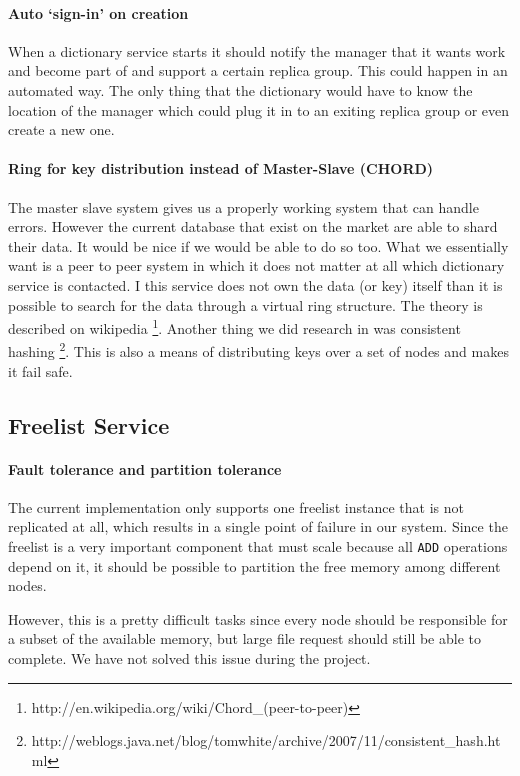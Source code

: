 \documentclass[12pt,a4paper]{scrartcl}
\begin{document}
\paragraph{Auto `sign-in' on creation}
When a dictionary service starts it should notify the manager that it wants work and become part of and support a certain replica group. This could happen in an automated way. The only thing that the dictionary would have to know the location of the manager which could plug it in to an exiting replica group or even create a new one.

\paragraph{Ring for key distribution instead of Master-Slave (CHORD)}
The master slave system gives us a properly working system that can handle errors. However the current database that exist on the market are able to shard their data. It would be nice if we would be able to do so too. What we essentially want is a peer to peer system in which it does not matter at all which dictionary service is contacted. I this service does not own the data (or key) itself than it is possible to search for the data through a virtual ring structure. The theory is described on wikipedia \footnote{http://en.wikipedia.org/wiki/Chord\_(peer-to-peer)}. Another thing we did research in was consistent hashing \footnote{http://weblogs.java.net/blog/tomwhite/archive/2007/11/consistent\_hash.html}. This is also a means of distributing keys over a set of nodes and makes it fail safe.

\subsection{Freelist Service}
\paragraph{Fault tolerance and partition tolerance}
The current implementation only supports one freelist instance that is not replicated at all, which results in a single point of failure in our system. Since the freelist is a very important component that must scale because all \verb|ADD| operations depend on it, it should be possible to partition the free memory among different nodes.

However, this is a pretty difficult tasks since every node should be responsible for a subset of the available memory, but large file request should still be able to complete. We have not solved this issue during the project.
\end{document}

